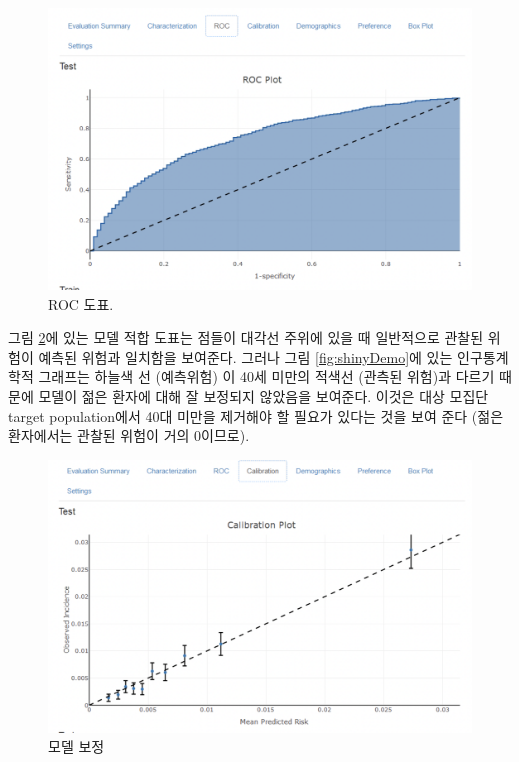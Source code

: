 \documentclass[10.5pt]{book}
\theoremstyle{definition}
\theoremstyle{definition}
\theoremstyle{definition}
\theoremstyle{remark}
\begin{document}
\begin{figure}

{\centering \includegraphics[width=1\linewidth]{images/PatientLevelPrediction/shiny/singleShiny/singleShinyRoc} 

}

\caption{ROC 도표.}\label{fig:shinyROC}
\end{figure}

그림 \ref{fig:shinyCal}에 있는 모델 적합 도표는 점들이 대각선 주위에
있을 때 일반적으로 관찰된 위험이 예측된 위험과 일치함을 보여준다. 그러나
그림 \ref{fig:shinyDemo}에 있는 인구통계학적 그래프는 하늘색 선
(예측위험) 이 40세 미만의 적색선 (관측된 위험)과 다르기 때문에 모델이
젊은 환자에 대해 잘 보정되지 않았음을 보여준다. 이것은 대상 모집단
target population에서 40대 미만을 제거해야 할 필요가 있다는 것을 보여
준다 (젊은 환자에서는 관찰된 위험이 거의 0이므로).

\begin{figure}

{\centering \includegraphics[width=1\linewidth]{images/PatientLevelPrediction/shiny/singleShiny/singleShinyCal} 

}

\caption{모델 보정}\label{fig:shinyCal}
\end{figure}
\end{document}
